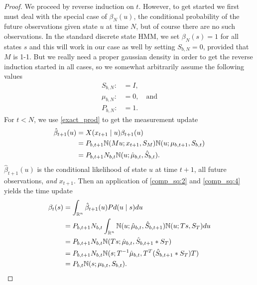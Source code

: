 \documentclass[12pt,leqno]{article}
\begin{document}
\begin{proof}
We proceed by reverse induction on $t$. However, to get started we first must  deal with
the special case of $\beta_{N}(u)$, the conditional probability of the future observations given
state $u$ at time $N$, but of course there are no such observations.  In the standard discrete
state HMM, we set $\beta_N(s) = 1$ for all states $s$ and this will work in our case as well by
setting $S_{b,N} = 0$, provided that $M$ is 1-1. But we really need a proper gaussian 
density in order to get the reverse induction started in all cases, so we somewhat arbitrarily
assume the following values
\begin{align*}
  S_{b,N} :&= I,\\
  \mu_{b,N} :&= 0,\quad\text{and}\\
  P_{b,N} :&= 1.
\end{align*}
  For $t <  N$, we use \eqref{exact_prod} to get the measurement update 
  \begin{align*}
    \hat{\beta}_{t+1}(u) &= X(x_{t+1}\mid u)\beta_{t+1}(u)\\
    &= P_{b,t+1}{\mathbb N}(Mu;x_{t+1},S_M){\mathbb N}(u;\mu_{b,t+1},S_{b,t})\\
    &= P_{b,t+1}N_{b,t}{\mathbb N}(u;\hat{\mu}_{b,t},\hat{S}_{b,t}).
  \end{align*}
  $\hat{\beta}_{t+1}(u)$ is the conditional likelihood of state $u$ at time $t+1$, all future observations, {\em and}
  $x_{t+1}$. Then an application of \eqref{comp_sq:2} and \eqref{comp_sq:4} yields the time update
  \begin{align*}
    \beta_t(s) &= \int_{{\mathbb R}^n}\hat{\beta}_{t+1}(u)Pd(u\mid s)du \\
    &= P_{b,t+1}N_{b,t}\int_{{\mathbb R}^n}{\mathbb N}(u;\hat{\mu}_{b,t},\hat{S}_{b,t+1}){\mathbb N}(u;Ts,S_T)du\\
    &=P_{b,t+1}N_{b,t}{\mathbb N}(Ts;\hat{\mu}_{b,t},\hat{S}_{b,t+1}*S_T)\\
    &=P_{b,t+1}N_{b,t}{\mathbb N}(s;T^{-1}\hat{\mu}_{b,t},T^T(\hat{S}_{b,t+1}*S_T)T)\\
    &=P_{b,t}{\mathbb N}(s;\mu_{b,t},S_{b,t}).
  \end{align*}
\end{proof}
\end{document}
